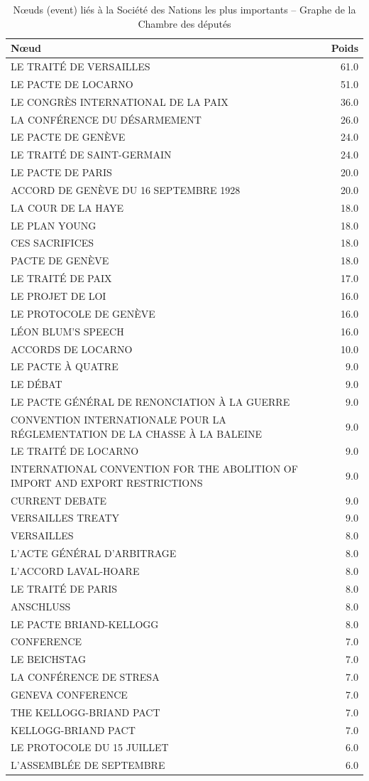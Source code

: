 \documentclass[a4paper,twoside,12pt]{book}
\begin{document}
\begin{table}[htbp]
\centering
\begin{tabular}{p{8cm}r}
\hline
\textbf{Nœud} & \textbf{Poids} \\
\hline
LE TRAITÉ DE VERSAILLES & 61.0 \\
LE PACTE DE LOCARNO & 51.0 \\
LE CONGRÈS INTERNATIONAL DE LA PAIX & 36.0 \\
LA CONFÉRENCE DU DÉSARMEMENT & 26.0 \\
LE PACTE DE GENÈVE & 24.0 \\
LE TRAITÉ DE SAINT-GERMAIN & 24.0 \\
LE PACTE DE PARIS & 20.0 \\
ACCORD DE GENÈVE DU 16 SEPTEMBRE 1928 & 20.0 \\
LA COUR DE LA HAYE & 18.0 \\
LE PLAN YOUNG & 18.0 \\
CES SACRIFICES & 18.0 \\
PACTE DE GENÈVE & 18.0 \\
LE TRAITÉ DE PAIX & 17.0 \\
LE PROJET DE LOI & 16.0 \\
LE PROTOCOLE DE GENÈVE & 16.0 \\
LÉON BLUM'S SPEECH & 16.0 \\
ACCORDS DE LOCARNO & 10.0 \\
LE PACTE À QUATRE & 9.0 \\
LE DÉBAT & 9.0 \\
LE PACTE GÉNÉRAL DE RENONCIATION À LA GUERRE & 9.0 \\
CONVENTION INTERNATIONALE POUR LA RÉGLEMENTATION DE LA CHASSE À LA BALEINE & 9.0 \\
LE TRAITÉ DE LOCARNO & 9.0 \\
INTERNATIONAL CONVENTION FOR THE ABOLITION OF IMPORT AND EXPORT RESTRICTIONS & 9.0 \\
CURRENT DEBATE & 9.0 \\
VERSAILLES TREATY & 9.0 \\
VERSAILLES & 8.0 \\
L'ACTE GÉNÉRAL D'ARBITRAGE & 8.0 \\
L'ACCORD LAVAL-HOARE & 8.0 \\
LE TRAITÉ DE PARIS & 8.0 \\
ANSCHLUSS & 8.0 \\
LE PACTE BRIAND-KELLOGG & 8.0 \\
CONFERENCE & 7.0 \\
LE BEICHSTAG & 7.0 \\
LA CONFÉRENCE DE STRESA & 7.0 \\
GENEVA CONFERENCE & 7.0 \\
THE KELLOGG-BRIAND PACT & 7.0 \\
KELLOGG-BRIAND PACT & 7.0 \\
LE PROTOCOLE DU 15 JUILLET & 6.0 \\
L'ASSEMBLÉE DE SEPTEMBRE & 6.0 \\
\hline
\end{tabular}
\caption{Nœuds (event) liés à la Société des Nations les plus importants – Graphe de la Chambre des députés}
\end{table}
\end{document}
